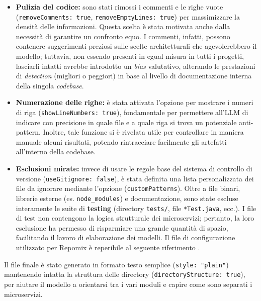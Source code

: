 \begin{itemize}
    \item \textbf{Pulizia del codice:} sono stati rimossi i commenti e le righe vuote (\texttt{removeComments: true}, \texttt{removeEmptyLines: true}) per massimizzare la densità delle informazioni. Questa scelta è stata motivata anche dalla necessità di garantire un confronto equo. I commenti, infatti, possono contenere suggerimenti preziosi sulle scelte architetturali che agevolerebbero il modello; tuttavia, non essendo presenti in egual misura in tutti i progetti, lasciarli intatti avrebbe introdotto un \textit{bias} valutativo, alterando le prestazioni di \textit{detection} (migliori o peggiori) in base al livello di documentazione interna della singola \textit{codebase}.
    
    \item \textbf{Numerazione delle righe:} è stata attivata l'opzione per mostrare i numeri di riga (\texttt{showLineNumbers: true}), fondamentale per permettere all'LLM di indicare con precisione in quale file e a quale riga si trova un potenziale anti-pattern. Inoltre, tale funzione si è rivelata utile per controllare in maniera manuale alcuni risultati, potendo rintracciare facilmente gli artefatti all'interno della codebase.
    
    \item \textbf{Esclusioni mirate:} invece di usare le regole base del sistema di controllo di versione (\texttt{useGitignore: false}), è stata definita una lista personalizzata dei file da ignorare mediante l'opzione  (\texttt{customPatterns}). Oltre a file binari, librerie esterne (es. \texttt{node\_modules}) e documentazione, sono state escluse interamente le suite di \textbf{testing} (directory \texttt{tests/}, file \texttt{*Test.java}, ecc.). I file di test non contengono la logica strutturale dei microservizi; pertanto, la loro esclusione ha permesso di risparmiare una grande quantità di spazio, facilitando il lavoro di elaborazione dei modelli.
    Il file di configurazione utilizzato per Repomix è reperibile al seguente riferimento \cite{barbato_tesi_llm_scripts}.
    
    
\end{itemize}

Il file finale è stato generato in formato testo semplice (\texttt{style: "plain"}) mantenendo intatta la struttura delle directory (\texttt{directoryStructure: true}), per aiutare il modello a orientarsi tra i vari moduli e capire come sono separati i microservizi.

